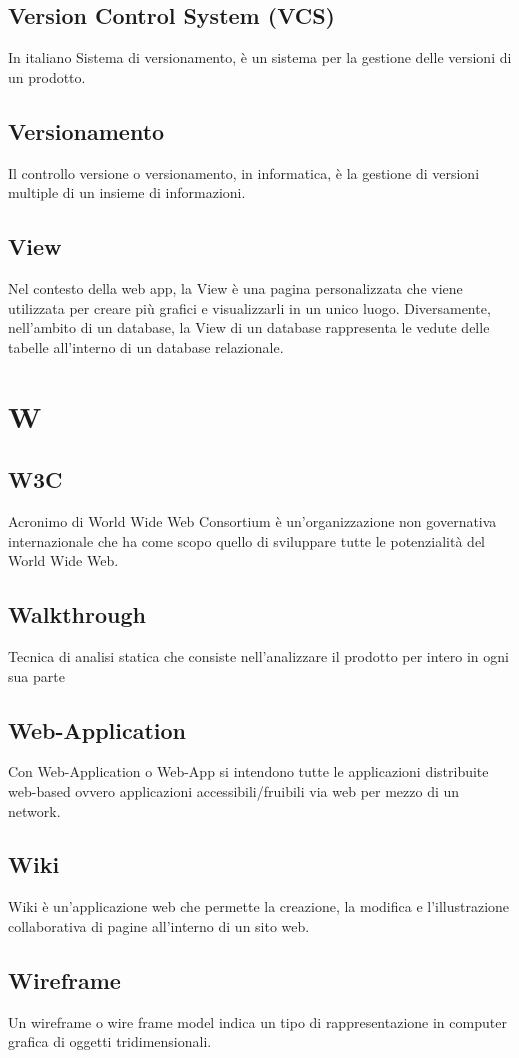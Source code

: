 \subsection{Version Control System (VCS)}  In italiano Sistema di versionamento, è un sistema per la gestione delle versioni di un prodotto.
\subsection{Versionamento}  Il controllo versione o versionamento, in informatica, è la gestione di versioni multiple di un insieme di informazioni. 
\subsection{View}  Nel contesto della web app, la View è una pagina personalizzata che viene utilizzata per creare più grafici e visualizzarli in un unico luogo. Diversamente, nell'ambito di un database, la View di un database rappresenta le vedute delle tabelle all'interno di un database relazionale.

\newpage \section{W}
\subsection{W3C}  Acronimo di World Wide Web Consortium è un'organizzazione non governativa internazionale che ha come scopo quello di sviluppare tutte le potenzialità del World Wide Web.
\subsection{Walkthrough}  Tecnica di analisi statica che consiste nell'analizzare il prodotto per intero in ogni sua parte
\subsection{Web-Application}  Con Web-Application o Web-App si intendono tutte le applicazioni distribuite web-based ovvero applicazioni accessibili/fruibili via web per mezzo di un network. 
\subsection{Wiki}  Wiki è un'applicazione web che permette la creazione, la modifica e l'illustrazione collaborativa di pagine all'interno di un sito web.
\subsection{Wireframe}  Un wireframe o wire frame model indica un tipo di rappresentazione in computer grafica di oggetti tridimensionali.
